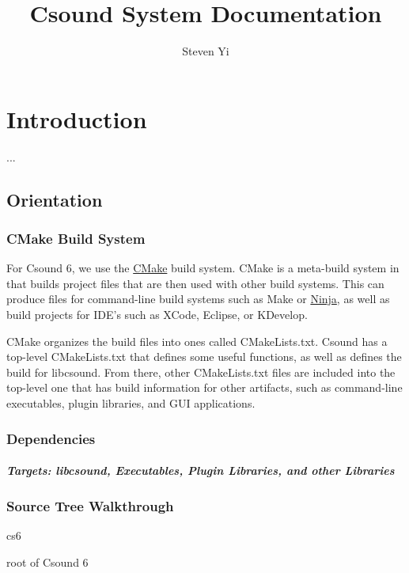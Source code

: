\documentclass[]{book}
\title{Csound System Documentation}
\author{Steven Yi}
\begin{document}
\maketitle

\chapter{Introduction}

...

\section{Orientation}

\subsection{CMake Build System}

For Csound 6, we use the \href{http://www.cmake.org}{CMake} build
system. CMake is a meta-build system in that builds project files that
are then used with other build systems. This can produce files for
command-line build systems such as Make or
\href{http://martine.github.io/ninja/}{Ninja}, as well as build projects
for IDE's such as XCode, Eclipse, or KDevelop.

CMake organizes the build files into ones called CMakeLists.txt. Csound
has a top-level CMakeLists.txt that defines some useful functions, as
well as defines the build for libcsound. From there, other
CMakeLists.txt files are included into the top-level one that has build
information for other artifacts, such as command-line executables,
plugin libraries, and GUI applications.

\subsection{Dependencies}

\paragraph{Targets: libcsound, Executables, Plugin Libraries, and other
Libraries}

\subsection{Source Tree Walkthrough}

cs6

root of Csound 6
\end{document}
